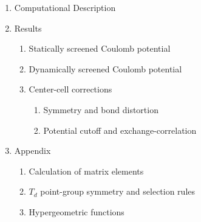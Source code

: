 \documentclass[aps, prl, preprint]{revtex4-2}
\begin{document}
\begin{enumerate}
\begin{enumerate}
\begin{enumerate}
            \item Symmetry and the Bloch functions
        \end{enumerate}
        \item Considering the effective mean field potential.
        \begin{enumerate}
            \item Statically screened Coulomb potential
            \item Dynamically screened Coulomb potential
            \item Center-cell corrections
            \begin{enumerate}
                \item Symmetry and bond distortion
                \item Potential cutoff and exchange-correlation
            \end{enumerate}
        \end{enumerate}
    \end{enumerate}
    \item Computational Description
    \item Results
    \begin{enumerate}
        \item Statically screened Coulomb potential
        \item Dynamically screened Coulomb potential
        \item Center-cell corrections
        \begin{enumerate}
            \item Symmetry and bond distortion
            \item Potential cutoff and exchange-correlation
        \end{enumerate}
    \end{enumerate}
    \item Appendix
    \begin{enumerate}
        \item Calculation of matrix elements
        \item $T_{d}$ point-group symmetry and selection rules
        \item Hypergeometric functions
    \end{enumerate}
\end{enumerate}
\end{document}
